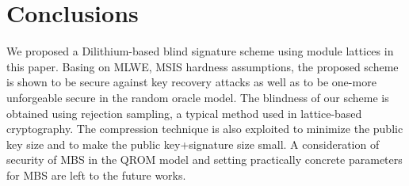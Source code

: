 \documentclass[conference]{IEEEtran}
\begin{document}
		
		\iffalse
		\begin{itemize}
			\item $\sigma$ is such that the number of restarts that locally occurs in Phase 2, in \eqref{k} is small. 
			\item $\beta$ has to satisfy \eqref{k2} with overwhelming probability and make $\Pr[\text{Step 15 passes}]$ in \eqref{k3} as high as possible. Certainly, a trivial choice for $\beta$ is $n(\sigma-1)\eta$ since $	\Vert c^*\mathbf{s}_i \Vert_{\infty}$. However, we need $\beta$ as smallest as possible to reduce the number of restarts happening  in Phase 3. Section 4.4. in \cite[]{DLL+17} gives a discussion on the role of $\beta$ saying that $\beta$ can be chosen satisfying that $\Pr[\Vert c\mathbf{s}_i \Vert_{\infty}>\beta] \approx 2^{-80}$. Similarly, we can set parameters such that $\Pr[\Vert c^*\mathbf{s}_i \Vert_{\infty}>\beta] \approx 2^{-80}$.
			\item  For \textsf{MLWE} to be secure against the primal attack and the dual attack, we should choose the smallest block size ($b$), the size of $\mathbf{s}_1, \mathbf{s}_1$$\eta, b, n,k,l,q$ such that  
			\begin{align}
			\eta \sqrt{b} &>\max_m(\delta^{2b-d-1}\cdot q^{m/d})\\
			R_{\text{min}}=1/(2^{0.2075b}\varepsilon_{\text{max}}^2) & \text{ is sufficiently large.} \label{k13}
			\end{align}
			
			\item 
			
		\end{itemize}
		
		\fi
		
		
		
		\section{Conclusions}
		
		We proposed a \textsf{Dilithium}-based blind signature scheme using module lattices in this paper. Basing on \textsf{MLWE}, \textsf{MSIS} hardness assumptions, the proposed scheme is shown to be secure against key recovery attacks as well as to be one-more unforgeable secure in the random oracle model. The blindness of our scheme is obtained using rejection sampling, a typical method used in lattice-based cryptography. The compression technique is also exploited to minimize the public key size and to make the public key+signature size small.  A consideration of security of \textsf{MBS} in the QROM model and setting practically concrete parameters for \textsf{MBS} are left to the future works. 
		
\end{document}
